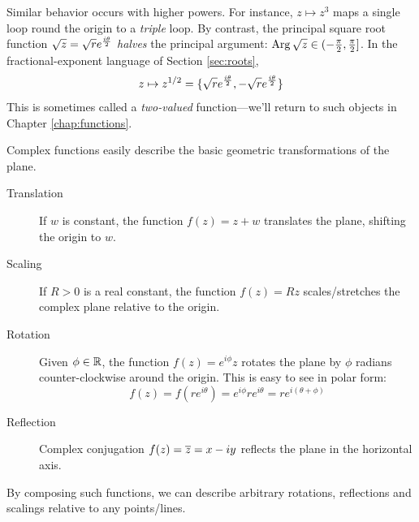 	Similar behavior occurs with higher powers. For instance, $z\mapsto z^3$ maps a single loop round the origin to a \emph{triple} loop. %
	By contrast, the principal square root function $\sqrt z=\sqrt re^{\frac{i\theta}{2}}$ \emph{halves} the principal argument: $\operatorname{Arg}\sqrt z\in (-\frac\pi 2,\frac\pi 2]$. In the fractional-exponent language of Section \ref{sec:roots},
	\[
		z\mapsto z^{1/2} =\{\sqrt re^{\frac{i\theta}{2}},-\sqrt re^{\frac{i\theta}{2}}\}
	\]
	This is sometimes called a \emph{two-valued} function---we'll return to such objects in Chapter \ref{chap:functions}.


\label{pg:2dgeom}

Complex functions easily describe the basic geometric transformations of the plane.
\begin{description}
	\item[Translation] If $w$ is constant, the function $f(z)=z+w$ translates the plane, shifting the origin to $w$.
	\item[Scaling] If $R>0$ is a real constant, the function $f(z)=Rz$ scales/stretches the complex plane relative to the origin.
	\item[Rotation] Given $\phi\in\mathbb{R}$, the function $f(z)=e^{i\phi}z$ rotates the plane by $\phi$ radians counter-clockwise around the origin. This is easy to see in polar form:
	\[
		f(z)=f(re^{i\theta})=e^{i\phi}re^{i\theta}=re^{i(\theta+\phi)}
	\]
	\item[Reflection] Complex conjugation $f(z)=\overline{z}=x-iy$ reflects the plane in the horizontal axis.
\end{description}

By composing such functions, we can describe arbitrary rotations, reflections and scalings relative to any points/lines.




